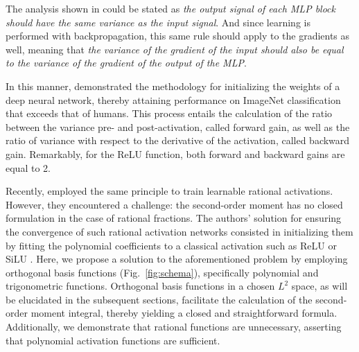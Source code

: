 \documentclass{article} %
\theoremstyle{plain}
\theoremstyle{definition}
\theoremstyle{remark}
\begin{document}
 The analysis shown in \cite{he2015delving} could be stated as \emph{the output signal of each MLP block should have the same variance as the input signal}. And since learning is performed with backpropagation, this same rule should apply to the gradients as well, meaning that \emph{the variance of the gradient of the input should also be equal to the variance of the gradient of the output of the MLP}. 

In this manner, \citet{he2015delving} demonstrated the methodology for initializing the weights of a deep neural network, thereby attaining performance on ImageNet classification that exceeds that of humans. This process entails the calculation of the ratio between the variance pre- and post-activation, called forward gain, as well as the ratio of variance with respect to the derivative of the activation, called backward gain. Remarkably, for the ReLU function, both forward and backward gains are equal to 2.

Recently, \citet{yang2025kolmogorovarnold} employed the same principle to train learnable rational activations. However, they encountered a challenge: the second-order moment has no closed formulation in the case of rational fractions. The authors' solution for ensuring the convergence of such rational activation networks consisted in initializing them by fitting the polynomial coefficients to a classical activation such as ReLU or SiLU \cite{ ramachandran2017searching, elfwing2018sigmoid}. Here, we  propose a solution to the aforementioned problem by employing orthogonal basis functions (Fig.~\ref{fig:schema}), specifically polynomial and trigonometric functions. Orthogonal basis functions in a chosen $L^2$ space, as will be elucidated in the subsequent sections, facilitate the calculation of the second-order moment integral, thereby yielding a closed and straightforward formula. Additionally, we demonstrate that rational functions are unnecessary, asserting that polynomial activation functions are sufficient.
\end{document}
